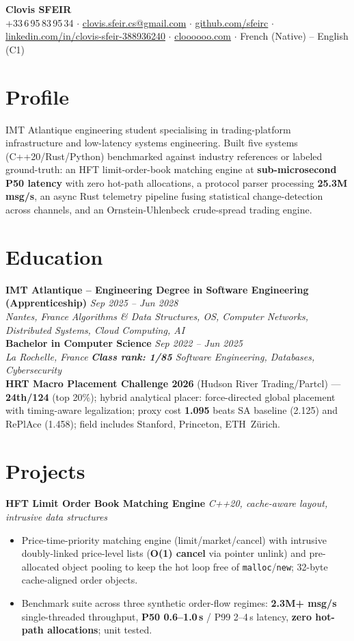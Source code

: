 \documentclass[10pt]{article}
\newcommand{\entry}[4]{%
  \noindent\textbf{#1} \hfill \textit{#2} \\
  \textit{#3} \hfill \textit{#4}\\[-0.3em]
}
\newcommand{\projectentry}[2]{%
  \noindent\textbf{#1} \hfill \textit{#2}\\[-0.3em]
}
\begin{document}
\fontsize{9.3pt}{11pt}\selectfont
\begin{center}
  {\LARGE \textbf{Clovis SFEIR}}\\[0.3em]
  +33\,6\,95\,83\,95\,34 \;$\cdot$\; \href{mailto:clovis.sfeir.cs@gmail.com}{clovis.sfeir.cs@gmail.com} \;$\cdot$\;
  \href{https://github.com/sfeirc}{github.com/sfeirc} \;$\cdot$\;
  \href{https://linkedin.com/in/clovis-sfeir-388936240}{linkedin.com/in/clovis-sfeir-388936240} \;$\cdot$\;
  \href{https://cloooooo.com}{cloooooo.com} \;$\cdot$\; French (Native) -- English (C1)
\end{center}

\section*{Profile}
IMT Atlantique engineering student specialising in trading-platform infrastructure and low-latency systems engineering. Built five systems (C++20/Rust/Python) benchmarked against industry references or labeled ground-truth: an HFT limit-order-book matching engine at \textbf{sub-microsecond P50 latency} with zero hot-path allocations, a protocol parser processing \textbf{25.3M msg/s}, an async Rust telemetry pipeline fusing statistical change-detection across channels, and an Ornstein-Uhlenbeck crude-spread trading engine.

\section*{Education}
\entry{IMT Atlantique -- Engineering Degree in Software Engineering (Apprenticeship)}{Sep 2025 -- Jun 2028}{Nantes, France}{Algorithms \& Data Structures, OS, Computer Networks, Distributed Systems, Cloud Computing, AI}
\entry{Bachelor in Computer Science}{Sep 2022 -- Jun 2025}{La Rochelle, France}{\textbf{Class rank: 1/85} \textbar{} Software Engineering, Databases, Cybersecurity}
\noindent\textbf{HRT Macro Placement Challenge 2026} (Hudson River Trading/Partcl) --- \textbf{24th/124} (top 20\%); hybrid analytical placer: force-directed global placement with timing-aware legalization; proxy cost \textbf{1.095} beats SA baseline (2.125) and RePlAce (1.458); field includes Stanford, Princeton, ETH~Z\"urich.

\section*{Projects}

\projectentry{HFT Limit Order Book Matching Engine}{C++20, cache-aware layout, intrusive data structures}
\begin{itemize}
  \item Price-time-priority matching engine (limit/market/cancel) with intrusive doubly-linked price-level lists (\textbf{O(1) cancel} via pointer unlink) and pre-allocated object pooling to keep the hot loop free of \texttt{malloc}/\texttt{new}; 32-byte cache-aligned order objects.
  \item Benchmark suite across three synthetic order-flow regimes: \textbf{2.3M+ msg/s} single-threaded throughput, \textbf{P50 0.6--1.0\,\textmu s} / P99 2--4\,\textmu s latency, \textbf{zero hot-path allocations}; unit tested.
\end{itemize}
\end{document}
